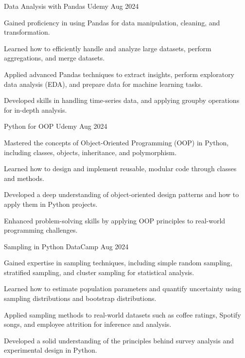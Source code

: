 \begin{cventries}
	
	\cventry
	{Data Analysis with Pandas} %
	{Udemy} %
	{\textcolor{neutraltext}{Aug 2024}} %
	{} %
	{
		\begin{cvitems} %
			\item Gained proficiency in using Pandas for data manipulation, cleaning, and transformation.
			\item Learned how to efficiently handle and analyze large datasets, perform aggregations, and merge datasets.
			\item Applied advanced Pandas techniques to extract insights, perform exploratory data analysis (EDA), and prepare data for machine learning tasks.
			\item Developed skills in handling time-series data, and applying groupby operations for in-depth analysis.
		\end{cvitems}
	}
	
	\cventry
	{Python for OOP} %
	{Udemy} %
	{\textcolor{neutraltext}{Aug 2024}} %
	{} %
	{
		\begin{cvitems} %
			\item Mastered the concepts of Object-Oriented Programming (OOP) in Python, including classes, objects, inheritance, and polymorphism.
			\item Learned how to design and implement reusable, modular code through classes and methods.
			\item Developed a deep understanding of object-oriented design patterns and how to apply them in Python projects.
			\item Enhanced problem-solving skills by applying OOP principles to real-world programming challenges.
		\end{cvitems}
	}
	 
	
	\cventry
	{Sampling in Python} %
	{DataCamp} %
	{\textcolor{neutraltext}{Aug 2024}} %
	{} %
	{
		\begin{cvitems} %
			\item Gained expertise in sampling techniques, including simple random sampling, stratified sampling, and cluster sampling for statistical analysis.
			\item Learned how to estimate population parameters and quantify uncertainty using sampling distributions and bootstrap distributions.
			\item Applied sampling methods to real-world datasets such as coffee ratings, Spotify songs, and employee attrition for inference and analysis.
			\item Developed a solid understanding of the principles behind survey analysis and experimental design in Python.
		\end{cvitems}
	}
	

\end{cventries}
